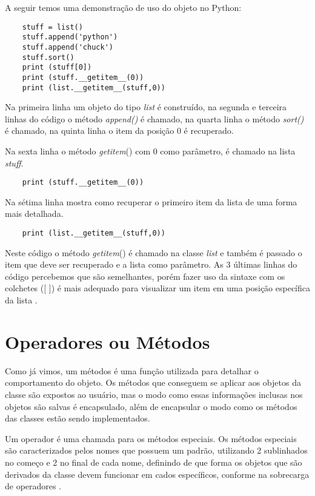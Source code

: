 	A seguir temos uma demonstração de uso do objeto no Python:
	
   \begin{lstlisting}
    stuff = list()
    stuff.append('python')
    stuff.append('chuck')
    stuff.sort()
    print (stuff[0])
    print (stuff.__getitem__(0))
    print (list.__getitem__(stuff,0))
    \end{lstlisting}
	
	Na primeira linha um objeto do tipo \textit{list} é construído, na segunda e terceira linhas do código o método \textit{append()} é chamado, na quarta linha o método \textit{sort()} é chamado, na quinta linha o item da posição 0 é recuperado. 
	
	Na sexta linha o método \textunderscore\textunderscore \textit{getitem}\textunderscore\textunderscore()  com 0 como parâmetro, é chamado na lista \textit{stuff}.
	\begin{lstlisting}
    print (stuff.__getitem__(0))
	\end{lstlisting}

	Na sétima linha mostra como recuperar o primeiro item da lista de uma forma mais detalhada.
	\begin{lstlisting}
    print (list.__getitem__(stuff,0))
	\end{lstlisting}
	
	Neste código o método \textunderscore\textunderscore \textit{getitem}\textunderscore\textunderscore () é chamado na classe \textit{list} e também é passado o item que deve ser recuperado e a lista como parâmetro. As 3 últimas linhas do código percebemos que são semelhantes, porém fazer uso da sintaxe com os colchetes ([ ]) é mais adequado para visualizar um item em uma posição específica da lista \cite{Severance2016}.
	
    \section{Operadores ou Métodos}
	Como já vimos, um métodos é uma função utilizada para detalhar o comportamento do objeto. Os métodos que conseguem se aplicar aos objetos da classe são expostos ao usuário, mas o modo como essas informações inclusas nos objetos são salvas é encapsulado, além de encapsular o modo como os métodos das classes estão sendo implementados.
	 
	Um operador é uma chamada para os métodos especiais. Os métodos especiais são caracterizados pelos nomes que possuem um padrão, utilizando 2 sublinhados no começo e 2 no final de cada nome, definindo de que forma os objetos que são derivados da classe devem funcionar em cados específicos, conforme na sobrecarga de operadores \cite{Borges2014}.
	
